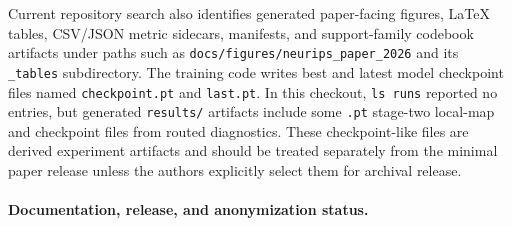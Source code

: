 Current repository search also identifies generated paper-facing figures,
LaTeX tables, CSV/JSON metric sidecars, manifests, and support-family codebook
artifacts under paths such as \texttt{docs/figures/neurips\_paper\_2026} and
its \texttt{\_tables} subdirectory. The training code writes best and latest
model checkpoint files named \texttt{checkpoint.pt} and \texttt{last.pt}. In
this checkout, \texttt{ls runs} reported no entries, but generated
\texttt{results/} artifacts include some \texttt{.pt} stage-two local-map and
checkpoint files from routed diagnostics. These checkpoint-like files are
derived experiment artifacts and should be treated separately from the minimal
paper release unless the authors explicitly select them for archival release.

\paragraph{Documentation, release, and anonymization status.}
